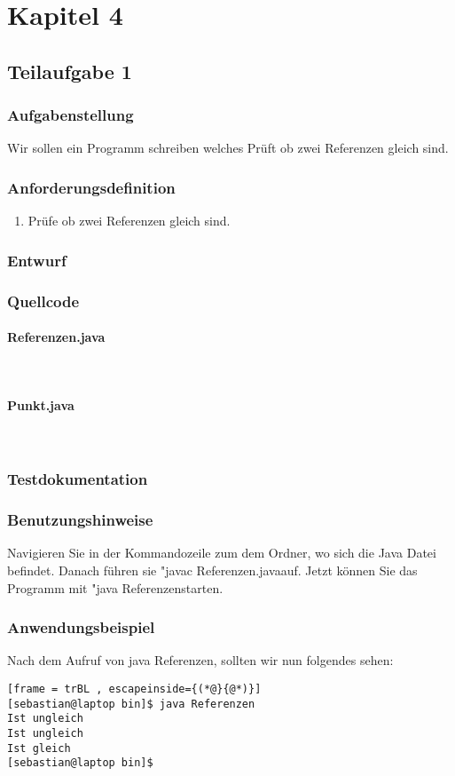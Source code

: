 \section{Kapitel 4}
\subsection{Teilaufgabe 1}
\subsubsection{Aufgabenstellung}
Wir sollen ein Programm schreiben welches Prüft ob zwei Referenzen gleich sind.

\subsubsection{Anforderungsdefinition}
\begin{enumerate}
	\item Prüfe ob zwei Referenzen gleich sind.
\end{enumerate}

\subsubsection{Entwurf}


\subsubsection{Quellcode}
\paragraph{Referenzen.java}\

\paragraph{Punkt.java}\


\subsubsection{Testdokumentation}

\subsubsection{Benutzungshinweise}
Navigieren Sie in der Kommandozeile zum dem Ordner, wo sich die Java Datei befindet.
Danach führen sie "javac Referenzen.java\dq \space auf. Jetzt können Sie das Programm mit
"java Referenzen\dq \space starten.

\subsubsection{Anwendungsbeispiel}
Nach dem Aufruf von java Referenzen, sollten wir nun folgendes sehen:
\begin{lstlisting}[frame = trBL , escapeinside={(*@}{@*)}]
[sebastian@laptop bin]$ java Referenzen 
Ist ungleich
Ist ungleich
Ist gleich
[sebastian@laptop bin]$  
\end{lstlisting}
